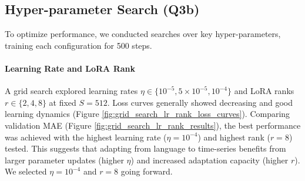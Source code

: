 \documentclass{article}
\begin{document}
\subsection{Hyper-parameter Search (Q3b)}

To optimize performance, we conducted searches over key hyper-parameters, training each configuration for 500 steps.

\paragraph{Learning Rate and LoRA Rank}
A grid search explored learning rates $\eta \in \{10^{-5}, 5 \times 10^{-5}, 10^{-4}\}$ and LoRA ranks $r \in \{2, 4, 8\}$ at fixed $S=512$. Loss curves generally showed decreasing and good learning dynamics (Figure \ref{fig:grid_search_lr_rank_loss_curves}). Comparing validation MAE (Figure \ref{fig:grid_search_lr_rank_results}), the best performance was achieved with the highest learning rate ($\eta=10^{-4}$) and highest rank ($r=8$) tested. This suggests that adapting from language to time-series benefits from larger parameter updates (higher $\eta$) and increased adaptation capacity (higher $r$). We selected $\eta=10^{-4}$ and $r=8$ going forward.
\end{document}
